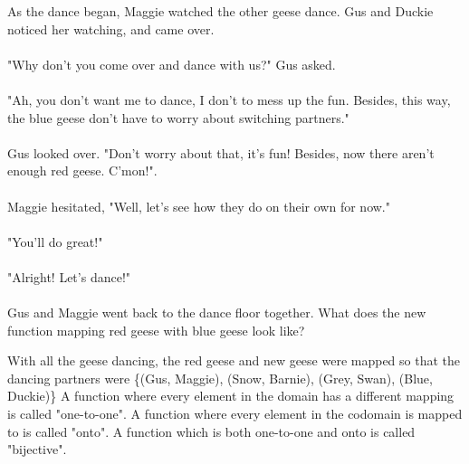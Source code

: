 {As the dance began, Maggie watched the other geese dance. Gus and Duckie noticed her watching, and came over. 
\paragraph{} "Why don't you come over and dance with us?" Gus asked. 
\paragraph{} "Ah, you don't want me to dance, I don't to mess up the fun. Besides, this way, the blue geese don't have to worry about switching partners."
\paragraph{} Gus looked over. "Don't worry about that, it's fun! Besides, now there aren't enough red geese. C'mon!".
\paragraph{} Maggie hesitated, "Well, let's see how they do on their own for now."
\paragraph{} "You'll do great!"
\paragraph{} "Alright! Let's dance!" 
\paragraph{} Gus and Maggie went back to the dance floor together. 
What does the new function mapping red geese with blue geese look like?}
{With all the geese dancing, the red geese and new geese were mapped so that the dancing partners were \{(Gus, Maggie), (Snow, Barnie), (Grey, Swan), (Blue, Duckie)\}}
{A function where every element in the domain has a different mapping is called "one-to-one". A function where every element in the codomain is mapped to is called "onto". A function which is both one-to-one and onto is called "bijective".}
{}

